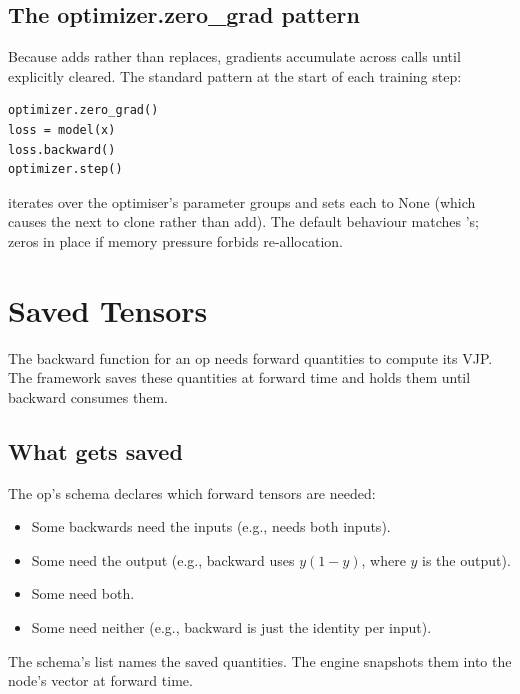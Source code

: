 \subsection{The optimizer.zero\_grad pattern}
\label{ssec:autograd_engine:zero_grad}

Because  adds rather than replaces, gradients
accumulate across  calls until explicitly
cleared. The standard pattern at the start of each training step:

\begin{lstlisting}[style=lucid,language=LucidPython]
optimizer.zero_grad()
loss = model(x)
loss.backward()
optimizer.step()
\end{lstlisting}

 iterates over the optimiser's
parameter groups and sets each  to None (which causes
the next  to clone rather than add). The
default behaviour matches 's; 
zeros in place if memory pressure forbids re-allocation.

\section{Saved Tensors}
\label{sec:autograd_engine:saved}

The backward function for an op needs forward quantities to
compute its VJP. The framework saves these quantities at forward
time and holds them until backward consumes them.

\subsection{What gets saved}
\label{ssec:autograd_engine:what_saved}

The op's schema declares which forward tensors are needed:

\begin{itemize}
  \item Some backwards need the inputs (e.g.,  needs
    both inputs).
  \item Some need the output (e.g.,  backward uses
    $y(1-y)$, where $y$ is the output).
  \item Some need both.
  \item Some need neither (e.g.,  backward is just the
    identity per input).
\end{itemize}

The schema's  list names the saved
quantities. The engine snapshots them into the node's
 vector at forward time.

